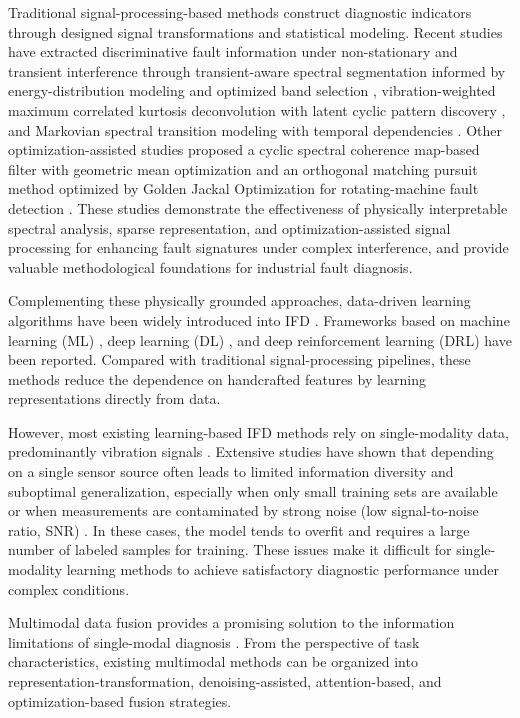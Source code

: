 \documentclass[a4paper]{cas-sc}
\begin{document}
Traditional signal-processing-based methods construct diagnostic indicators through designed signal transformations and statistical modeling. Recent studies have extracted discriminative fault information under non-stationary and transient interference through transient-aware spectral segmentation informed by energy-distribution modeling and optimized band selection
\cite{ChenCEP2026}, vibration-weighted maximum correlated
kurtosis deconvolution with latent cyclic pattern discovery \cite{ChenJSV2026}, and Markovian spectral transition modeling with temporal dependencies \cite{ChenND2026}. Other optimization-assisted studies proposed a cyclic spectral coherence map-based filter with geometric mean optimization \cite{ChauhanTIA2026} and an orthogonal matching pursuit method optimized by Golden Jackal Optimization for rotating-machine fault
detection \cite{VashishthaSHM2025}. These studies demonstrate the effectiveness of physically interpretable spectral analysis, sparse representation, and optimization-assisted signal processing for
enhancing fault signatures under complex interference, and provide valuable methodological foundations for industrial fault diagnosis.

Complementing these physically grounded approaches, data-driven learning algorithms have been widely introduced into IFD \cite{Gearbox1}. Frameworks based on machine learning (ML) \cite{Machinelearning,ZhangTIE2022}, deep learning (DL) \cite{Deeplearning,ZhangESWA2025}, and deep reinforcement learning (DRL) \cite{DRL,1} have been reported. Compared with traditional signal-processing pipelines, these methods reduce the dependence on handcrafted features by learning representations directly from data.

However, most existing learning-based IFD methods rely on
single-modality data, predominantly vibration signals
\cite{SingleVibration1,SingleVibration2}. Extensive studies have shown that depending on a single sensor source often leads to limited information diversity and suboptimal generalization, especially when only small training sets are available or when measurements are contaminated by strong noise (low signal-to-noise ratio, SNR) \cite{Single,SOFTLABEL,Residual}. In these cases, the model tends to overfit and requires a large number of labeled samples for training. These issues make it difficult for single-modality learning methods to achieve satisfactory diagnostic performance under complex conditions.

Multimodal data fusion provides a promising solution to the information limitations of single-modal diagnosis
\cite{2,3}. From the perspective of task characteristics,
existing multimodal methods can be organized into representation-transformation, denoising-assisted,
attention-based, and optimization-based fusion strategies.
\end{document}
